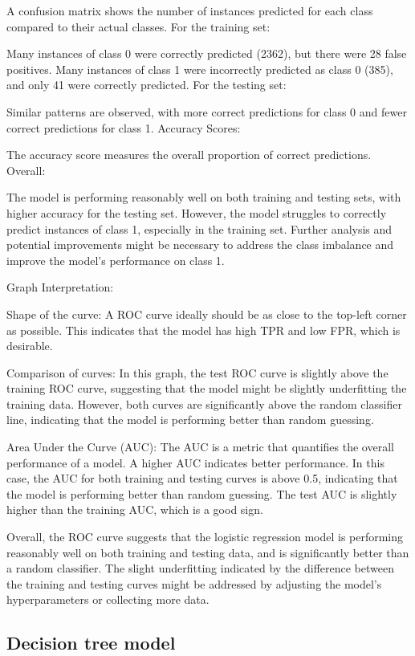 \documentclass[11pt]{article}
\begin{document}
A confusion matrix shows the number of instances predicted for each
class compared to their actual classes. For the training set:

Many instances of class 0 were correctly predicted (2362), but there
were 28 false positives. Many instances of class 1 were incorrectly
predicted as class 0 (385), and only 41 were correctly predicted. For
the testing set:

Similar patterns are observed, with more correct predictions for class 0
and fewer correct predictions for class 1. Accuracy Scores:

The accuracy score measures the overall proportion of correct
predictions. Overall:

The model is performing reasonably well on both training and testing
sets, with higher accuracy for the testing set. However, the model
struggles to correctly predict instances of class 1, especially in the
training set. Further analysis and potential improvements might be
necessary to address the class imbalance and improve the model's
performance on class 1.

Graph Interpretation:

Shape of the curve: A ROC curve ideally should be as close to the
top-left corner as possible. This indicates that the model has high TPR
and low FPR, which is desirable.

Comparison of curves: In this graph, the test ROC curve is slightly
above the training ROC curve, suggesting that the model might be
slightly underfitting the training data. However, both curves are
significantly above the random classifier line, indicating that the
model is performing better than random guessing.

Area Under the Curve (AUC): The AUC is a metric that quantifies the
overall performance of a model. A higher AUC indicates better
performance. In this case, the AUC for both training and testing curves
is above 0.5, indicating that the model is performing better than random
guessing. The test AUC is slightly higher than the training AUC, which
is a good sign.

Overall, the ROC curve suggests that the logistic regression model is
performing reasonably well on both training and testing data, and is
significantly better than a random classifier. The slight underfitting
indicated by the difference between the training and testing curves
might be addressed by adjusting the model's hyperparameters or
collecting more data.

    \subsection{Decision tree model}\label{decision-tree-model}
\end{document}
